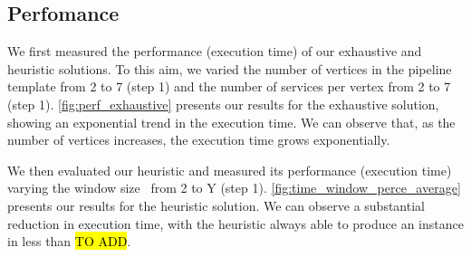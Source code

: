 \subsection{Perfomance}\label{subsec:experiments_performance}
We first measured the performance (execution time) of our exhaustive and heuristic solutions. To this aim, we varied the number of vertices in the pipeline template from 2 to 7 (step 1) and the number of services per vertex from 2 to 7 (step 1). \cref{fig:perf_exhaustive} presents our results for the exhaustive solution, showing an exponential trend in the execution time. We can observe that, as the number of vertices increases, the execution time grows exponentially.

We then evaluated our heuristic and measured its performance (execution time) varying the window size \windowsize\ from 2 to Y (step 1). \cref{fig:time_window_perce_average} presents our results for the heuristic solution. We can observe a substantial reduction in execution time, with the heuristic always able to produce an instance in less than \hl{TO ADD}.


